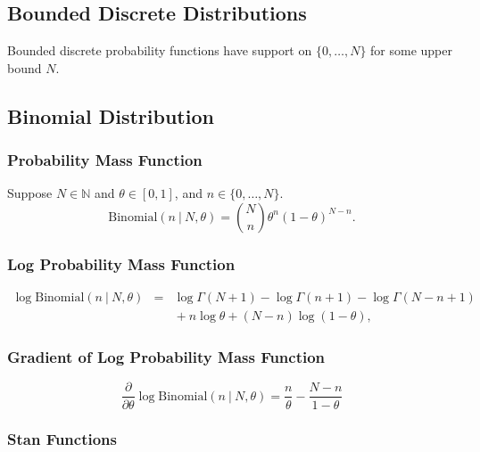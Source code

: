 \begin{description}
{\begin{description}
\chapter{Bounded Discrete Distributions}


Bounded discrete probability functions have support on $\{ 0, \ldots, N \}$ for some upper bound $N$.


\section{Binomial Distribution}


\subsection{Probability Mass Function}


Suppose $N \in \mathbb{N}$ and $\theta \in [0,1]$, and $n \in \{0,\ldots,N\}$. \[ \text{Binomial}(n~|~N,\theta) = \binom{N}{n} \theta^n (1 - \theta)^{N - n}. \] 

\subsection{Log Probability Mass Function}


\begin{eqnarray*} \log \text{Binomial}(n~|~N,\theta) & = & \log \Gamma(N+1) - \log \Gamma(n + 1) - \log \Gamma(N- n + 1) \\[4pt] & & { } + n \log \theta + (N - n) \log (1 - \theta), \end{eqnarray*}



\subsection{Gradient of Log Probability Mass Function}

 \[ \frac{\partial}{\partial \theta} \log \text{Binomial}(n~|~N,\theta) = \frac{n}{\theta} - \frac{N - n}{1 - \theta} \] 



\subsection{Stan Functions}



\end{description}}
\end{description}
